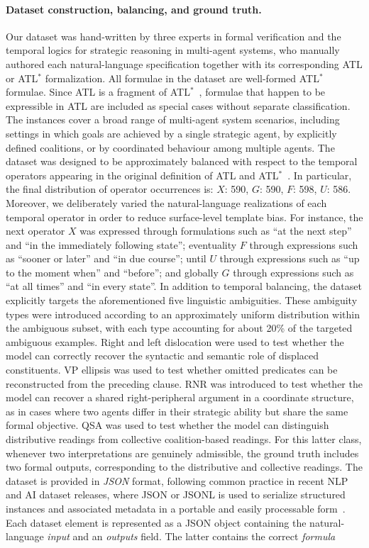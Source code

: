 \paragraph{Dataset construction, balancing, and ground truth.}
Our dataset was hand-written by three experts in formal verification and the temporal logics for strategic reasoning in multi-agent systems, who manually authored each natural-language specification together with its corresponding ATL or ATL$^\ast$ formalization. All formulae in the dataset are well-formed ATL$^\ast$~ formulae. Since ATL is a fragment of ATL$^\ast$~, formulae that happen to be expressible in ATL are included as special cases without separate classification. The instances cover a broad range of multi-agent system scenarios, including settings in which goals are achieved by a single strategic agent, by explicitly defined coalitions, or by coordinated behaviour among multiple agents. The dataset was designed to be approximately balanced with respect to the temporal operators appearing in the original definition of ATL and ATL$^\ast$~\cite{alur2002alternating}. In particular, the final distribution of operator occurrences is: $X$: 590, $G$: 590, $F$: 598, $U$: 586. Moreover, we deliberately varied the natural-language realizations of each temporal operator in order to reduce surface-level template bias. For instance, the next operator $X$ was expressed through formulations such as ``at the next step'' and ``in the immediately following state''; eventuality $F$ through expressions such as ``sooner or later'' and ``in due course''; until $U$ through expressions such as ``up to the moment when'' and ``before''; and globally $G$ through expressions such as ``at all times'' and ``in every state''. In addition to temporal balancing, the dataset explicitly targets the aforementioned five linguistic ambiguities. These ambiguity types were introduced according to an approximately uniform distribution within the ambiguous subset, with each type accounting for about 20\% of the targeted ambiguous examples. Right and left dislocation were used to test whether the model can correctly recover the syntactic and semantic role of displaced constituents. VP ellipsis was used to test whether omitted predicates can be reconstructed from the preceding clause. RNR was introduced to test whether the model can recover a shared right-peripheral argument in a coordinate structure, as in cases where two agents differ in their strategic ability but share the same formal objective. QSA was used to test whether the model can distinguish distributive readings from collective coalition-based readings. For this latter class, whenever two interpretations are genuinely admissible, the ground truth includes two formal outputs, corresponding to the distributive and collective readings. The dataset is provided in \textit{JSON} format, following common practice in recent NLP and AI dataset releases, where JSON or JSONL is used to serialize structured instances and associated metadata in a portable and easily processable form~\cite{wang2025verifiable}. Each dataset element is represented as a JSON object containing the natural-language \textit{input} and an \textit{outputs} field. The latter contains the correct \textit{formula} 